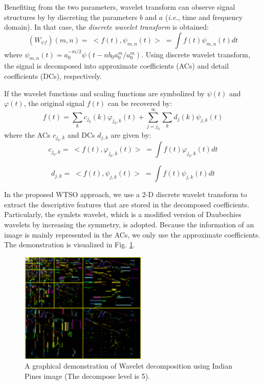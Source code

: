 \documentclass{ws-ijwmip}
\begin{document}
Benefiting from the two parameters, wavelet transform can observe signal structures by by discreting the parameters $b$ and $a$ (\textit{i.e.}, time and frequency domain).
In that case, the \emph{discrete wavelet transform} is obtained:
\begin{equation}
(W_{\psi f})(m,n) 
=\; < f(t),\psi _{m,n}(t)>\; = \int f(t)\psi _{m,n}(t)dt
\label{equ2.2}
\end{equation}
where $\psi _{m,n}(t)=a_{0}^{-m/2}\psi (t-n{b_0}{a _{0}^{m}}/{a _{0}^{m}})$.
Using discrete wavelet transform, the signal is decomposed into approximate coefficients (ACs) and detail coefficients (DCs), respectively. 

If the wavelet functions and scaling functions are symbolized by $\psi(t)$ and $\varphi(t)$, the original signal $f(t)$ can be recovered by:
\begin{equation}
f(t)=\sum _k c_{j_0}(k)\varphi _{j_0,k}(t) + \sum_{j=j_0}^{\infty }\sum _k d_j(k)\psi _{j,k}(t)
\label{equ2.3}
\end{equation}
where the ACs $c_{j_0,k}$ and DCs $d_{j,k}$ are given by:
\begin{equation}
c_{j_0,k} =\; < f(t),\varphi _{j_0,k}(t)>\; =\int f(t) \varphi _{j_0,k}(t)dt
\label{equ2.4}
\end{equation}

\begin{equation}
d_{j,k} =\; < f(t),\psi _{j,k}(t)>\; =\int f(t) \psi _{j,k}(t)dt
\label{equ2.5}
\end{equation}

In the proposed WTSO approach, we use a 2-D discrete wavelet transform to extract the descriptive features that are stored in the decomposed coefficients.
Particularly, the symlets wavelet, which is a modified version of Daubechies wavelets by increasing the symmetry, is adopted. 
Because the information of an image is mainly represented in the ACs, we only use the approximate coefficients. The demonstration is visualized in Fig. \ref{figure2}. 

\begin{figure}[htb]
	\centerline{\includegraphics[width=6cm]{image/decompose}}
	\vspace*{8pt}
	\caption{
		A graphical demonstration of Wavelet decomposition using Indian Pines image
		(The decompose level is 5).
	}
	\label{figure2}
\end{figure}
\end{document}

